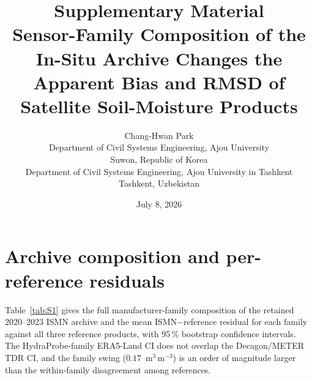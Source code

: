 \documentclass[11pt]{article}
\title{Supplementary Material\\
\large Sensor-Family Composition of the In-Situ Archive Changes the
Apparent Bias and RMSD of Satellite Soil-Moisture Products}
\author{Chang-Hwan Park\\
\small Department of Civil Systems Engineering, Ajou University\\
\small Suwon, Republic of Korea\\
\small Department of Civil Systems Engineering, Ajou University in Tashkent\\
\small Tashkent, Uzbekistan}
\date{July 8, 2026}
\begin{document}
\maketitle

\section{Archive composition and per-reference residuals}
Table~\ref{tab:S1} gives the full manufacturer-family composition of the
retained 2020–2023 ISMN archive and the mean ISMN$-$reference residual
for each family against all three reference products, with 95\,\%
bootstrap confidence intervals. The HydraProbe-family ERA5-Land CI does
not overlap the Decagon/METER TDR CI, and the family swing
($0.17$~m$^3$\,m$^{-3}$) is an order of magnitude larger than the
within-family disagreement among references.

\begin{table}[h!]
\centering
\caption{ISMN 2020–2023 composition and mean ISMN$-$reference residual
(m$^3$\,m$^{-3}$) by manufacturer family, 95\,\% bootstrap CI (5{,}000
resamples). Residual means use the valid-coverage matchup set; the
composition count and the ERA5 residual count differ because not every
station-sensor has valid coverage in every product (e.g., 1{,}231 of
1{,}274 HydraProbe-family sensors have valid ERA5-Land coverage).}
\label{tab:S1}
\small
{}
\end{table}
\end{document}

